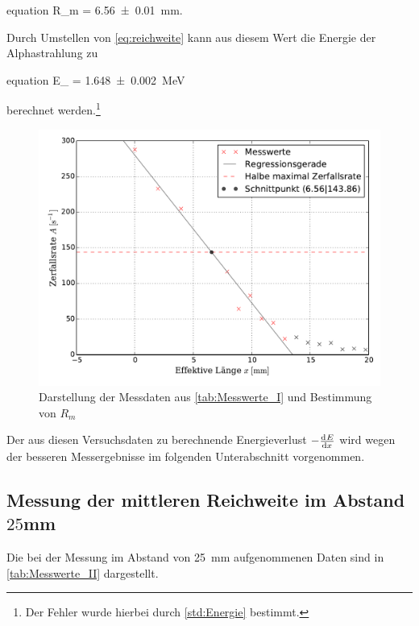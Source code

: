 	\begin{empheq}{equation}
		R_{m} = \SI{6.56(1)}{\milli\meter}.
		\label{eq:Messergebnis_I_R}
	\end{empheq} 
	Durch Umstellen von \cref{eq:reichweite} kann aus diesem Wert 
	die Energie der Alphastrahlung zu 
	\begin{empheq}{equation}
		E_{\alpha} = \SI{1.648(2)}{\mega\eV} 
		\label{eq:Messergebnis_I_E}
	\end{empheq}	
	berechnet werden.\footnote{Der Fehler wurde hierbei durch \eqref{std:Energie} bestimmt.}    

	
	\begin{figure}[!h]
		\centering
		\includegraphics[scale=0.7]{Grafiken/MittlereReichweiteI.pdf}
		\caption{Darstellung der Messdaten aus \cref{tab:Messwerte_I} und Bestimmung von $R_{m}$}
		\label{fig:Messdaten_I}
	\end{figure}
	
	\vspace*{0.5cm}
	Der aus diesen Versuchsdaten zu berechnende Energieverlust $-\od{E}{x}$ wird wegen der besseren
	Messergebnisse im folgenden Unterabschnitt vorgenommen.  
	
	
\subsection{Messung der mittleren Reichweite im Abstand $25$\si{\mm}}\label{sec:Messung_II}
	
	Die bei der Messung im Abstand von \SI{25}{\milli\meter} aufgenommenen Daten sind in \cref{tab:Messwerte_II} 
	dargestellt.

